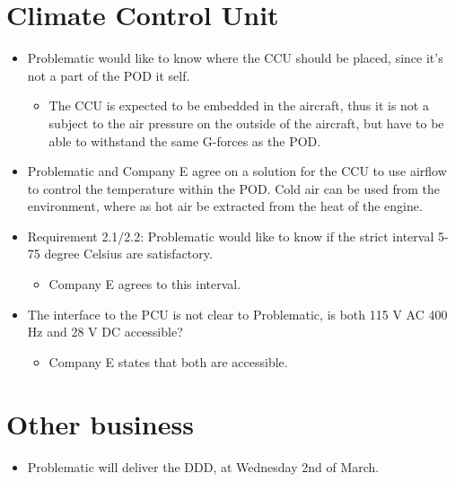 \section*{Climate Control Unit}
\begin{itemize}
    \item Problematic would like to know where the CCU should be placed, since it's not a part of the POD it self.
    \begin{itemize}
        \item The CCU is expected to be embedded in the aircraft, thus it is not a subject to the air pressure on the outside of the aircraft, but have to be able to withstand the same G-forces as the POD. 
    \end{itemize}
    \item Problematic and Company E agree on a solution for the CCU to use airflow to control the temperature within the POD. Cold air can be used from the environment, where as hot air be extracted from the heat of the engine.
    \item Requirement 2.1/2.2: Problematic would like to know if the strict interval 5-75 degree Celsius are satisfactory.
    \begin{itemize}
        \item Company E agrees to this interval.
   \end{itemize} 
   \item The interface to the PCU is not clear to Problematic, is both 115 V AC 400 Hz and 28 V DC accessible?
   \begin{itemize}
       \item Company E states that both are accessible.
    \end{itemize}
\end{itemize}


\section*{Other business}
\begin{itemize}
    \item Problematic will deliver the DDD, at Wednesday 2nd of March.
\end{itemize}

